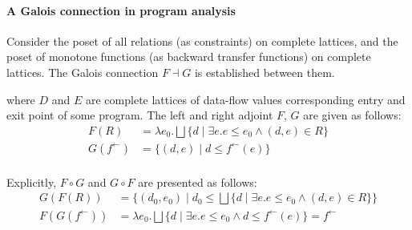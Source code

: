 \documentclass{llncs}
\newcommand{\Pow}{\mathcal{P}}
\newcommand{\Rel}{\mathrm{Rel}}
\newcommand{\Unidir}{\mathrm{Bwd}}
\newcommand{\tomon}{\to_{\mathrm{mon}}}
\newcommand{\fb}{{f^{\leftarrow}}}
\newcommand{\bigjoin}{\bigsqcup}
\newcommand{\comp}{\circ}
\begin{document}
 \paragraph{A Galois connection in program analysis}

    Consider the poset of all relations (as constraints) on complete lattices, and the poset of monotone functions (as backward transfer functions) on complete lattices.
    The Galois connection $F \dashv G$ is established between them.
  \begin{center}
  \end{center}
  where $D$ and $E$ are complete lattices of data-flow values corresponding entry and exit point of some program. The left and right adjoint $F$, $G$ are given as follows:
  \begin{align*}
    F(R) &= \lambda e_{0} . \bigjoin \{ d \mid \exists e. e \leq e_{0}  \land (d , e) \in R \} \\
    G(\fb) &= \{ (d , e) \mid d \leq \fb(e) \} \\
  \end{align*}

  Explicitly, $F \comp G$ and $G \comp F$ are presented as follows:
  \begin{align*}
    G(F(R)) &= \{ (d_{0},e_{0}) \mid d_{0} \leq \bigjoin \{ d \mid \exists e.e \leq e_{0} \land (d,e) \in R \}\} \\
    F(G(\fb)) &= \lambda e_{0} . \bigjoin \{ d \mid \exists e. e \leq e_{0} \land d \leq \fb(e) \} = \fb
  \end{align*}
\end{document}
